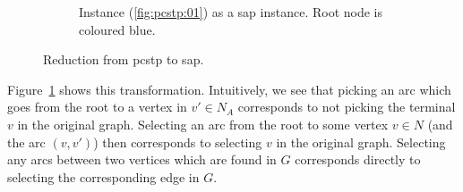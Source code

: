 \begin{figure}[h]
\begin{subfigure}[t]{0.47\linewidth}
    \caption{Instance (\ref{fig:pcstp:01}) as a \gls{sap} instance. Root node is coloured blue.}
  \end{subfigure}
  \caption{Reduction from \gls{pcstp} to \gls{sap}.}
  \label{fig:scip:pcstptosap}
\end{figure}

Figure~\ref{fig:scip:pcstptosap} shows this transformation. Intuitively, we see that
picking an arc which goes from the root to a vertex in $v' \in N_A$
corresponds to not picking the terminal $v$ in the original graph. Selecting an arc from the root
to some vertex $v \in N$ (and the arc $(v, v')$) then corresponds to selecting $v$
in the original graph. Selecting any arcs between two vertices which are found in $G$ corresponds
directly to selecting the corresponding edge in $G$.

